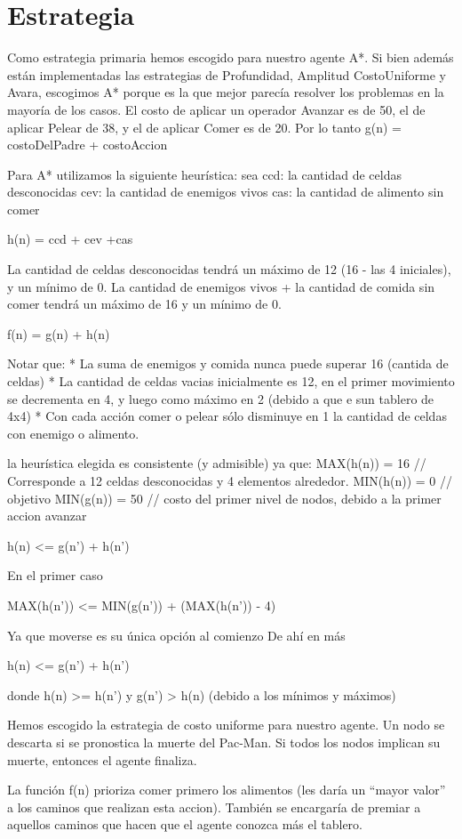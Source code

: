 ﻿\section{Estrategia}

Como estrategia primaria hemos escogido para nuestro agente A*.
Si bien además están implementadas las estrategias de Profundidad, Amplitud
CostoUniforme y Avara, escogimos A* porque es la que mejor parecía resolver los 
problemas en la mayoría de los casos.
El costo de aplicar un operador Avanzar es de 50, el de aplicar Pelear de 38, y el 
de aplicar Comer es de 20.
Por lo tanto
g(n) = costoDelPadre + costoAccion

Para A* utilizamos la siguiente heurística:
sea 
ccd: la cantidad de celdas desconocidas
cev: la cantidad de enemigos vivos
cas: la cantidad de alimento sin comer

h(n) = ccd + cev +cas

La cantidad de celdas desconocidas tendrá un máximo de 12 (16 - las 4 iniciales), 
y un mínimo de 0.
La cantidad de enemigos vivos + la cantidad de comida sin comer tendrá un máximo 
de 16 y un mínimo de 0.

f(n) = g(n) + h(n)

Notar que:
* La suma de enemigos y comida nunca puede superar 16 (cantida de celdas)
* La cantidad de celdas vacias inicialmente es 12, en el primer movimiento se decrementa 
en 4, y luego como máximo en 2 (debido a que e sun tablero de 4x4)
* Con cada acción comer o pelear sólo disminuye en 1 la cantidad de celdas
con enemigo o alimento.

la heurística elegida es consistente (y admisible) ya que:
MAX(h(n)) = 16    // Corresponde a 12 celdas desconocidas y 4 elementos alrededor.
MIN(h(n)) = 0     // objetivo
MIN(g(n)) =  50   // costo del primer nivel de nodos, debido a la primer accion avanzar

h(n) <= g(n') + h(n')

En el primer caso

MAX(h(n')) <= MIN(g(n')) + (MAX(h(n')) - 4)

Ya que moverse es su única opción al comienzo
De ahí en más

h(n) <= g(n') + h(n')

donde h(n) >= h(n')
y g(n') > h(n) (debido a los mínimos y máximos)

Hemos escogido la estrategia de costo uniforme para nuestro agente. Un nodo se
descarta si se pronostica la muerte del Pac-Man. Si todos los nodos implican su
muerte, entonces el agente finaliza.

La función f(n) prioriza comer primero los alimentos (les daría un ``mayor
valor'' a los caminos que realizan esta accion). También se encargaría de premiar
a aquellos caminos que hacen que el agente conozca más el tablero.
